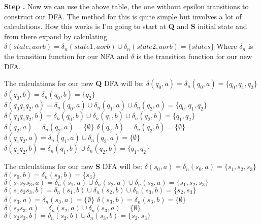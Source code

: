 \documentclass{article}
\newcounter{step}
\newcommand\Step{%
  \stepcounter{step}%
  \textbf{Step \thestep. }%
}
\begin{document}
\Step Now we can use the above table, the one without epsilon transitions to construct our DFA. The method
for this is quite simple but involves a lot of calculations. How this works is I'm going to start at 
\textbf{Q} and \textbf{S} initial state and from there expand by calculating $\delta (state, a or b) = 
\delta_n (state1, a or b) \cup \delta_n (state2, a or b) = \{states\}$ Where $\delta_n$ is the transition 
function for our NFA and $\delta$ is the transition function for our new DFA.

The calculations for our new \textbf{Q} DFA will be: \newline
$\delta(q_0,a) = \delta_n(q_0,a) = \{q_0,q_1,q_2\}$ \newline
$\delta(q_0,b) = \delta_n(q_0,b) = \{q_2\}$ \newline
$\delta(q_0q_1q_2, a) = \delta_n(q_0,a) \cup \delta_n(q_1,a) \cup \delta_n(q_2,a) = \{q_0,q_1,q_2\}$ \newline
$\delta(q_0q_1q_2, b) = \delta_n(q_0,b) \cup \delta_n(q_1,b) \cup \delta_n(q_2,b) = \{q_1,q_2\}$ \newline
$\delta(q_2,a) = \delta_n(q_2,a) = \{\emptyset\}$ \newline
$\delta(q_2,b) = \delta_n(q_2,b) = \{\emptyset\}$ \newline
$\delta(q_1q_2, a) = \delta_n(q_1,a) \cup \delta_n(q_2,a) = \{\emptyset\}$ \newline
$\delta(q_1q_2, b) = \delta_n(q_1,b) \cup \delta_n(q_2,b) = \{q_1,q_2\}$ \newline

The calculations for our new \textbf{S} DFA will be: \newline
$\delta(s_0, a) = \delta_n(s_0,a) = \{s_1,s_2,s_3\}$ \newline
$\delta(s_0, b) = \delta_n(s_0,b) = \{s_3\}$ \newline
$\delta(s_1s_2s_3, a) = \delta_n(s_1,a) \cup \delta_n(s_2,a) \cup \delta_n(s_3,a) = \{s_1,s_2,s_3\}$ \newline
$\delta(s_1s_2s_3, b) = \delta_n(s_1,b) \cup \delta_n(s_2,b) \cup \delta_n(s_3,b) = \{s_2,s_3\}$ \newline
$\delta(s_3, a) = \delta_n(s_3,a) = \{\emptyset\}$ \newline
$\delta(s_3, b) = \delta_n(s_3,b) = \{\emptyset\}$ \newline
$\delta(s_2s_3, a) = \delta_n(s_2,a) \cup \delta_n(s_3,a) = \{\emptyset\}$ \newline
$\delta(s_2s_3, b) = \delta_n(s_2,b) \cup \delta_n(s_3,b) = \{s_2,s_3\}$ \newline
\end{document}
